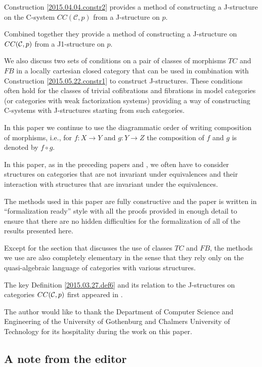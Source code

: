 \documentclass[12pt]{article}
\numberwithin{equation}{section}
\newcommand{\sr}{\rightarrow}
\newcommand{\toCC}{CC} %
\begin{document}
Construction \ref{2015.04.04.constr2} provides a method of constructing a
J-structure on the C-system $\toCC({\mathcal C},p)$ from a J-structure on $p$.

Combined together they provide a method of constructing a J-structure on
$\toCC({\cal C},p)$ from a J1-structure on $p$.

We also discuss two sets of conditions on a pair of classes of morphisms $TC$
and $FB$ in a locally cartesian closed category that can be used in combination
with Construction \ref{2015.05.22.constr1} to construct J-structures. These
conditions often hold for the classes of trivial cofibrations and fibrations in
model categories (or categories with weak factorization systems) providing a
way of constructing C-systems with J-structures starting from such categories.

In this paper we continue to use the diagrammatic order of writing composition
of morphisms, i.e., for $f:X\sr Y$ and $g:Y\sr Z$ the composition of $f$ and
$g$ is denoted by $f\circ g$.

In this paper, as in the preceding papers \cite{Cfromauniverse} and
\cite{fromunivwithPi}, we often have to consider structures on categories that
are not invariant under equivalences and their interaction with structures that
are invariant under the equivalences.

The methods used in this paper are fully constructive and the paper is written
in ``formalization ready'' style with all the proofs provided in enough detail
to ensure that there are no hidden difficulties for the formalization of all of
the results presented here.

Except for the section that discusses the use of classes $TC$ and $FB$, the
methods we use are also completely elementary in the sense that they rely only
on the quasi-algebraic language of categories with various structures.

The key Definition \ref{2015.03.27.def6} and its relation to the J-structures
on categories $\toCC({\cal C},p)$ first appeared in \cite{CMUtalk}.

The author would like to thank the Department of Computer Science and
Engineering of the University of Gothenburg and Chalmers University of
Technology for its hospitality during the work on this paper.


\subsection{A note from the editor}
\end{document}
